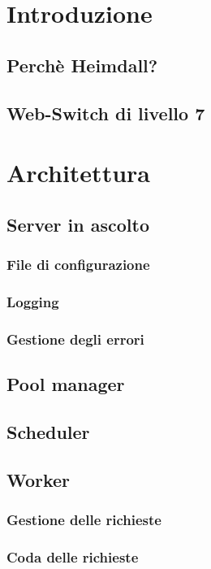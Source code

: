 \documentclass[italian]{tktltiki2}
\begin{document}
\newpage
\section{Introduzione}

\subsection{Perchè Heimdall?}
\subsection{Web-Switch di livello 7}



\newpage
\section{Architettura}

\subsection{Server in ascolto}
\subsubsection{File di configurazione}
\subsubsection{Logging}
\subsubsection{Gestione degli errori}

\subsection{Pool manager}

\subsection{Scheduler}

\subsection{Worker}
\subsubsection{Gestione delle richieste}
\subsubsection*{Coda delle richieste}
\end{document}
